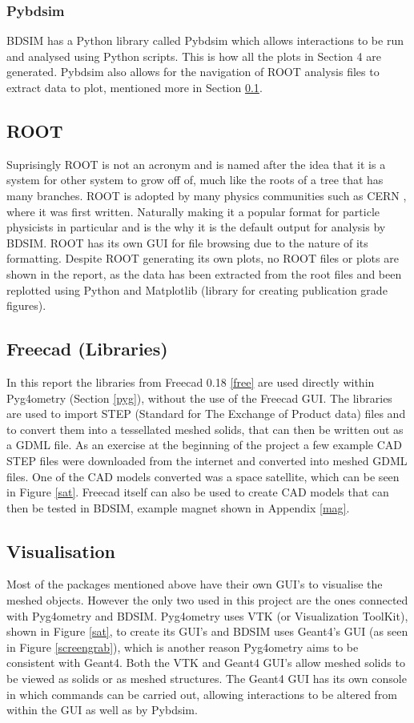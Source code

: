 \documentclass[12pt,a4paper]{article}
\begin{document}
\subsubsection{Pybdsim}
BDSIM has a Python library called Pybdsim which allows interactions to be run and analysed using Python scripts. This is how all the plots in Section 4 are generated. Pybdsim also allows for the navigation of ROOT analysis files to extract data to plot, mentioned more in Section \ref{root}.

\subsection{ROOT}\label{root}
Suprisingly ROOT is not an acronym and is named after the idea that it is a system for other system to grow off of, much like the roots of a tree that has many branches. ROOT is adopted by many physics communities such as CERN \cite{cern}, where it was first written. Naturally making it a popular format for particle physicists in particular and is the why it is the default output for analysis by BDSIM. ROOT has its own GUI for file browsing due to the nature of its formatting. Despite ROOT generating its own plots, no ROOT files or plots are shown in the report, as the data has been extracted from the root files and been replotted using Python and Matplotlib (library for creating publication grade figures).

\subsection{Freecad (Libraries)}
In this report the libraries from Freecad 0.18 \ref{free} are used directly within Pyg4ometry (Section \ref{pyg}), without the use of the Freecad GUI. The libraries are used to import STEP (Standard for The Exchange of Product data) files and to convert them into a tessellated meshed solids, that can then be written out as a GDML file. As an exercise at the beginning of the project a few example CAD STEP files were downloaded from the internet and converted into meshed GDML files. One of the CAD models converted was a space satellite, which can be seen in Figure \ref{sat}. Freecad itself can also be used to create CAD models that can then be tested in BDSIM, example magnet shown in Appendix \ref{mag}.

\subsection{Visualisation}
Most of the packages mentioned above have their own GUI's to visualise the meshed objects. However the only two used in this project are the ones connected with Pyg4ometry and BDSIM. Pyg4ometry uses VTK (or Visualization ToolKit), shown in Figure \ref{sat}, to create its GUI's and BDSIM uses Geant4's GUI (as seen in Figure \ref{screengrab}), which is another reason Pyg4ometry aims to be consistent with Geant4. Both the VTK and Geant4 GUI's allow meshed solids to be viewed as solids or as meshed structures. The Geant4 GUI has its own console in which commands can be carried out, allowing interactions to be altered from within the GUI as well as by Pybdsim.
\end{document}
